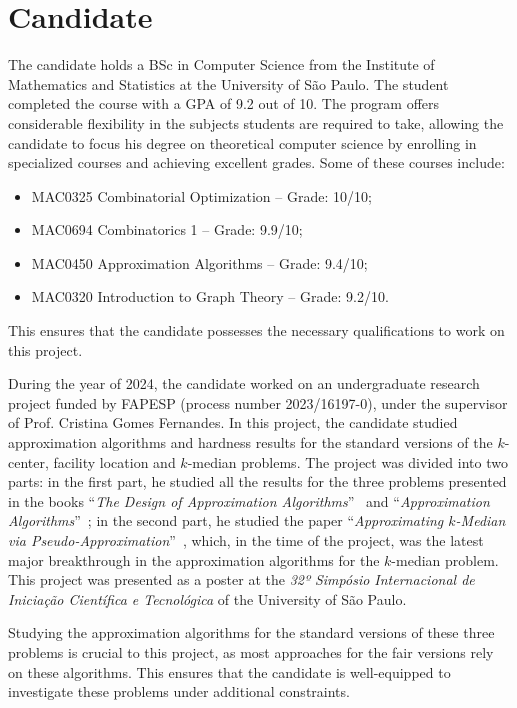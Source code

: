 \documentclass[12pt]{article}
\begin{document}
\section{Candidate}
The candidate holds a BSc in Computer Science from the Institute of Mathematics and Statistics at the University of São Paulo.
The student completed the course with a GPA of 9.2 out of 10. The program offers considerable flexibility in the subjects students are required to take, allowing the candidate to focus his degree on theoretical computer science by enrolling in specialized courses and achieving excellent grades. Some of these courses include:
\begin{itemize} 
    \item MAC0325 Combinatorial Optimization – Grade: 10/10; 
    \item MAC0694 Combinatorics 1 – Grade: 9.9/10; 
    \item MAC0450 Approximation Algorithms – Grade: 9.4/10; 
    \item MAC0320 Introduction to Graph Theory – Grade: 9.2/10. 
\end{itemize}
This ensures that the candidate possesses the necessary qualifications to work on this project.

During the year of 2024, the candidate worked on an undergraduate research project funded by FAPESP (process number 2023/16197-0), under the supervisor of Prof. Cristina Gomes Fernandes.
In this project, the candidate studied approximation algorithms and hardness results for the standard versions of the $k$-center, facility location and $k$-median problems. 
The project was divided into two parts: in the first part, he studied all the results for the three problems presented in the books  ``\emph{The Design of Approximation Algorithms}''~\cite{books/WS} and ``\emph{Approximation Algorithms}''~\cite{books/Vazirani}; in the second part, he studied the paper ``\emph{Approximating $k$-Median via Pseudo-Approximation}''~\cite{LS2012}, which, in the time of the project, was the latest major breakthrough in the approximation algorithms for the $k$-median problem. 
This project was presented as a poster at the \emph{32º Simpósio Internacional de Iniciação Científica e Tecnológica} of the University of São Paulo.

Studying the approximation algorithms for the standard versions of these three problems is crucial to this project, as most approaches for the fair versions rely on these algorithms. This ensures that the candidate is well-equipped to investigate these problems under additional constraints.
\newpage
\end{document}
